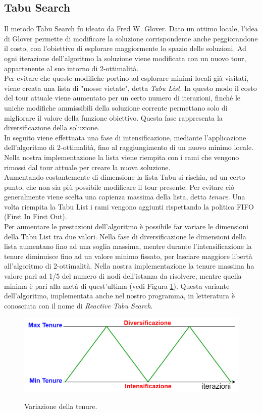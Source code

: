 \subsection{Tabu Search}
Il metodo Tabu Search fu ideato da Fred W. Glover. Dato un ottimo locale, l'idea di Glover permette di modificare la soluzione corrispondente anche peggiorandone il costo, con l'obiettivo di esplorare maggiormente lo spazio delle soluzioni. Ad ogni iterazione dell'algoritmo la soluzione viene modificata con un nuovo tour, appartenente al suo intorno di 2-ottimalità.\\
Per evitare che queste modifiche portino ad esplorare minimi locali già visitati, viene creata una lista di "mosse vietate", detta \textit{Tabu List}. In questo modo il costo del tour attuale viene aumentato per un certo numero di iterazioni, finché le uniche modifiche ammissibili della soluzione corrente permettano solo di migliorare il valore della funzione obiettivo. Questa fase rappresenta la diversificazione della soluzione.\\
In seguito viene effettuata una fase di intensificazione, mediante l'applicazione dell'algoritmo di 2-ottimalità, fino al raggiungimento di un nuovo minimo locale.\\
Nella nostra implementazione la lista viene riempita con i rami che vengono rimossi dal tour attuale per creare la nuova soluzione.\\
Aumentando costantemente di dimensione la lista Tabu si rischia, ad un certo punto, che non sia più possibile modificare il tour presente. Per evitare ciò generalmente viene scelta una capienza massima della lista, detta \textit{tenure}. Una volta riempita la Tabu List i rami vengono aggiunti rispettando la politica FIFO (First In First Out).\\
Per aumentare le prestazioni dell'algoritmo è possibile far variare le dimensioni della Tabu List tra due valori. Nella fase di diversificazione le dimensioni della lista aumentano fino ad una soglia massima, mentre durante l'intensificazione la tenure diminuisce fino ad un valore minimo fissato, per lasciare maggiore libertà all'algoritmo di 2-ottimalità. Nella nostra implementazione la tenure massima ha valore pari ad 1/5 del numero di nodi dell'istanza da risolvere, mentre quella minima è pari alla metà di quest'ultima (vedi Figura \ref{tenure}). Questa variante dell'algoritmo, implementata anche nel nostro programma, in letteratura è conosciuta con il nome di \textit{Reactive Tabu Search}.
 \begin{figure}[H] 
\begin{center} 
  \includegraphics[scale=0.35]{Images/tenure}\\ 
  \caption{\footnotesize{Variazione della tenure.}}
  \label{tenure}
\end{center}
\end{figure}
